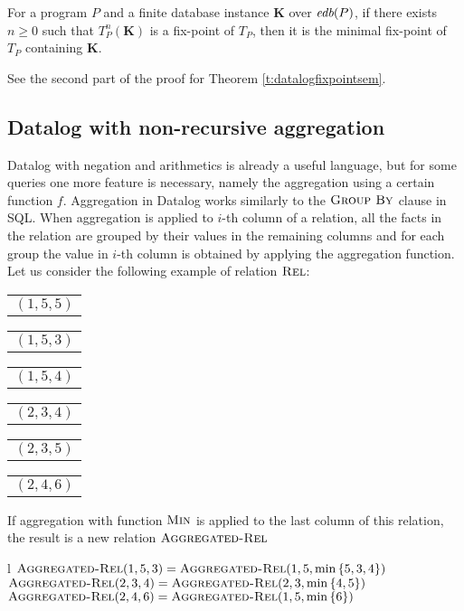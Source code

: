 \begin{thm}
For a program $P$ and a finite database instance $\textbf{K}$ over $\textit{edb}(P)$, if there exists $n \ge 0$ such that $T_P^n(\textbf{K})$ is a fix-point of $T_P$, then it is the minimal fix-point of $T_P$ containing $\textbf{K}$.
\end{thm}
\begin{prof}
See the second part of the proof for Theorem \ref{t:datalogfixpointsem}. \QEDA
\end{prof}


\subsection{Datalog with non-recursive aggregation}\label{ss:datalognra}

Datalog with negation and arithmetics is already a useful language, but for some queries one more feature is necessary, namely the  aggregation using a certain function $f$. Aggregation in Datalog \cite{fod, aggss, lcagg} works similarly to the $\textsc{Group By}$ clause in SQL. When aggregation is applied to $i$-th column of a relation, all the facts in the relation are grouped by their values in the remaining columns and for each group the value in $i$-th column is obtained by applying the aggregation function.
Let us consider the following example of relation $\textsc{Rel}$:

\begin{center}
\begin{tabular}{l}
  $(1, 5, 5)$
\end{tabular}
\quad
\begin{tabular}{l}
  $(1, 5, 3)$
\end{tabular}
\quad
\begin{tabular}{l}
  $(1, 5, 4)$
\end{tabular}
\quad
\begin{tabular}{l}
  $(2, 3, 4)$
\end{tabular}
\quad
\begin{tabular}{l}
  $(2, 3, 5)$
\end{tabular}
\quad
\begin{tabular}{l}
  $(2, 4, 6)$
\end{tabular}
\end{center}


If aggregation with function $\textsc{Min}$ is applied to the last column of this relation, the result is a new relation $\textsc{Aggregated-Rel}$

\begin{centab}{ l }
  $\textsc{Aggregated-Rel}(1, 5, 3) = \textsc{Aggregated-Rel}(1, 5, \min{\{5, 3, 4\}})$ \\
  $\textsc{Aggregated-Rel}(2, 3, 4) = \textsc{Aggregated-Rel}(2, 3, \min{\{4, 5\}})$ \\
  $\textsc{Aggregated-Rel}(2, 4, 6) = \textsc{Aggregated-Rel}(1, 5, \min{\{6\}})$ \\
\end{centab}

